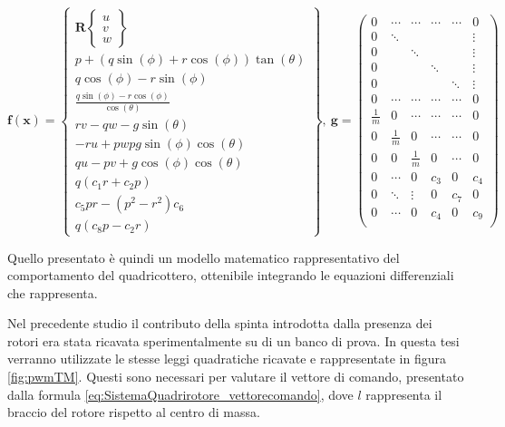 \begin{equation}\label{eq:SistemaQuadrirotore_statespaceElement}
	\mathbf{f(x)} = \begin{Bmatrix}
		\mathbf{R} \begin{Bmatrix}
			u \\ v \\ w
		\end{Bmatrix} \\
		p + (q\sin(\phi)+r\cos(\phi))\tan(\theta) \\
		q\cos(\phi) - r\sin(\phi) \\
		\frac{q\sin(\phi) - r\cos(\phi)}{\cos(\theta)}\\
		rv-qw-g\sin(\theta)\\
		-ru + pw p g \sin(\phi)\cos(\theta)\\
		qu - pv + g \cos(\phi)\cos(\theta)\\
		q (c_1 r + c_2 p)\\
		c_5 pr - (p^2-r^2) c_6 \\
		q(c_8 p - c_2 r)
	\end{Bmatrix}, \ \mathbf{g} =
	\begin{pmatrix}
		0 & \cdots & \cdots & \cdots & \cdots & 0 \\
		0 & \ddots & & & & \vdots \\
		0 & & \ddots & & & \vdots \\
		0 & & & \ddots & & \vdots \\
		0 & & & & \ddots & \vdots \\
		0 & \cdots & \cdots & \cdots & \cdots & 0 \\
		\frac{1}{m} & 0 & \cdots & \cdots & \cdots & 0 \\
		0 & \frac{1}{m} & 0 & \cdots & \cdots & 0 \\
		0 & 0 & \frac{1}{m} & 0 & \cdots & 0 \\
		0 & \cdots & 0 & c_3 & 0 & c_4 \\
		0 & \ddots & \vdots & 0 & c_7 & 0 \\
		0 & \cdots & 0 & c_4 & 0 & c_9 \\
	\end{pmatrix}
\end{equation}

Quello presentato è quindi un modello matematico rappresentativo del comportamento del quadricottero, ottenibile integrando le equazioni differenziali che rappresenta.

Nel precedente studio il contributo della spinta introdotta dalla presenza dei rotori era stata ricavata sperimentalmente su di un banco di prova. In questa tesi verranno utilizzate le stesse leggi quadratiche ricavate e rappresentate in figura \ref{fig:pwmTM}. Questi sono necessari per valutare il vettore di comando, presentato dalla formula \ref{eq:SistemaQuadrirotore_vettorecomando}, dove $l$ rappresenta il braccio del rotore rispetto al centro di massa.

